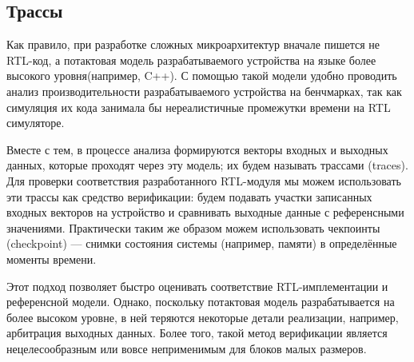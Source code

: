 \subsection{Трассы}

\tab Как правило, при разработке сложных микроархитектур вначале пишется не RTL-код, а потактовая модель разрабатываемого устройства на языке более высокого уровня(например, C++). С помощью такой модели удобно проводить анализ производительности разрабатываемого устройства на бенчмарках, так как симуляция их кода занимала бы нереалистичные промежутки времени на RTL симуляторе. 

Вместе с тем, в процессе анализа формируются векторы входных и выходных данных, которые проходят через эту модель; их будем называть трассами (traces). Для проверки соответствия разработанного RTL-модуля мы можем использовать эти трассы как средство верификации: будем подавать участки записанных входных векторов на устройство и сравнивать выходные данные с референсными значениями. Практически таким же образом можем использовать чекпоинты (checkpoint) --- снимки состояния системы (например, памяти) в определённые моменты времени. 

Этот подход позволяет быстро оценивать соответствие RTL-имплементации и референсной модели. Однако, поскольку потактовая модель разрабатывается на более высоком уровне, в ней теряются некоторые детали реализации, например, арбитрация выходных данных. Более того, такой метод верификации является нецелесообразным или вовсе неприменимым для блоков малых размеров. 
